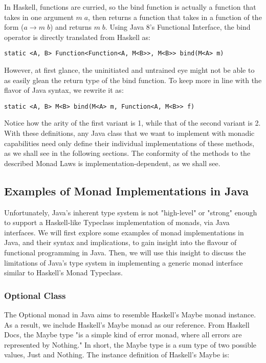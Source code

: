 In Haskell, functions are curried, so the bind function is actually a function that takes in one argument $m\;a$, then returns a function that takes in a function of the form ($a \to m\;b$) and returns $m\;b$. Using Java 8's Functional Interface, the bind operator is directly translated from Haskell as:
\begin{verbatim}
static <A, B> Function<Function<A, M<B>>, M<B>> bind(M<A> m)
\end{verbatim}

However, at first glance, the uninitiated and untrained eye might not be able to as easily glean the return type of the bind function. To keep more in line with the flavor of Java syntax, we rewrite it as:
\begin{verbatim}
static <A, B> M<B> bind(M<A> m, Function<A, M<B>> f)
\end{verbatim}

Notice how the arity of the first variant is 1, while that of the second variant is 2. With these definitions, any Java class that we want to implement with monadic capabilities need only define their individual implementations of these methods, as we shall see in the following sections. The conformity of the methods to the described Monad Laws is implementation-dependent, as we shall see.

\subsection{Examples of Monad Implementations in Java}
\label{sec:6}

Unfortunately, Java's inherent type system is not "high-level" or "strong" enough to support a Haskell-like Typeclass implementation of monads, via Java interfaces. We will first explore some examples of monad implementations in Java, and their syntax and implications, to gain insight into the flavour of functional programming in Java. Then, we will use this insight to discuss the limitations of Java's type system in implementing a generic monad interface similar to Haskell's Monad Typeclass.

\subsubsection{Optional Class}
\label{sec:7}

The Optional monad in Java aims to resemble Haskell's Maybe monad instance. As a result, we include Haskell's Maybe monad as our reference. From Haskell Docs, the Maybe type "is a simple kind of error monad, where all errors are represented by Nothing." In short, the Maybe type is a sum type of two possible values, Just and Nothing. The instance definition of Haskell's Maybe is:

